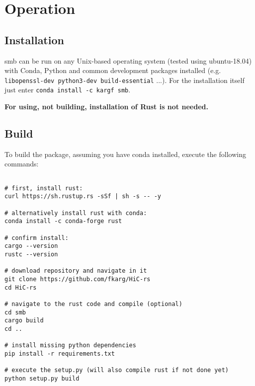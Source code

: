 \newpage
\section{Operation}\label{sec:operation}



\subsection{Installation}\label{sec:install}


smb can be run on any Unix-based operating system (tested using ubuntu-18.04)
with Conda, Python and common development packages installed (e.g.
\verb!libopenssl-dev python3-dev build-essential! ...). For the installation
itself just enter \verb|conda install -c kargf smb|.

\textbf{For using, not building, installation of Rust is not needed.}


\subsection{Build}\label{sec:build}

To build the package, assuming you have conda installed, execute the following
commands:

\begin{verbatim}

# first, install rust:
curl https://sh.rustup.rs -sSf | sh -s -- -y

# alternatively install rust with conda:
conda install -c conda-forge rust

# confirm install:
cargo --version
rustc --version

# download repository and navigate in it
git clone https://github.com/fkarg/HiC-rs
cd HiC-rs

# navigate to the rust code and compile (optional)
cd smb
cargo build
cd ..

# install missing python dependencies
pip install -r requirements.txt

# execute the setup.py (will also compile rust if not done yet)
python setup.py build

\end{verbatim}





